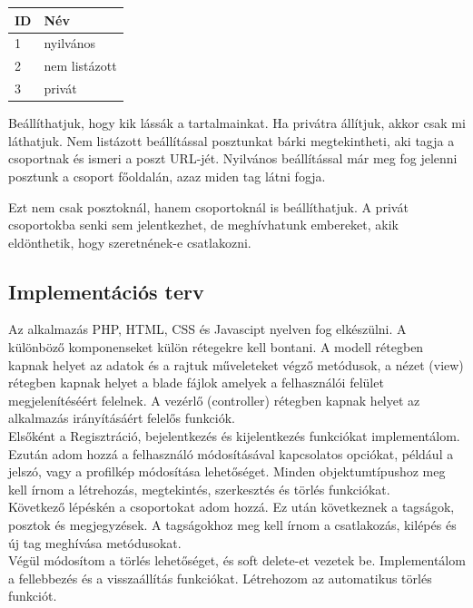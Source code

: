 \documentclass[
]{thesis-ekf}
\theoremstyle{definition}
\theoremstyle{remark}
\begin{document}
\begin{table}[H]
	\begin{tabular}{|l|l|}
		\hline
		\rule{0pt}{4ex}\rule[-2ex]{0pt}{0pt}
		\textbf{ID} &
		\textbf{Név} \\
		\hline
		1 &
		nyilvános \\
		\hline
		2 &
		nem listázott \\
		\hline
		3 &
		privát \\
		\hline
	\end{tabular}
\end{table}
\noindent
Beállíthatjuk, hogy kik lássák a tartalmainkat. Ha privátra állítjuk, akkor csak mi láthatjuk. Nem listázott beállítással posztunkat bárki megtekintheti, aki tagja a csoportnak és ismeri a poszt URL-jét. Nyilvános beállítással már meg fog jelenni posztunk a csoport főoldalán, azaz miden tag látni fogja.

Ezt nem csak posztoknál, hanem csoportoknál is beállíthatjuk. A privát csoportokba senki sem jelentkezhet, de meghívhatunk embereket, akik eldönthetik, hogy szeretnének-e csatlakozni.

\subsection{Implementációs terv}

Az alkalmazás PHP, HTML, CSS és Javascipt nyelven fog elkészülni. A különböző komponenseket külön rétegekre kell bontani. A modell rétegben kapnak helyet az adatok és a rajtuk műveleteket végző metódusok, a nézet (view) rétegben kapnak helyet a blade fájlok amelyek a felhasználói felület megjelenítéséért felelnek. A vezérlő (controller) rétegben kapnak helyet az alkalmazás irányításáért felelős funkciók.
\vspace{5mm}
\\
Elsőként a Regisztráció, bejelentkezés és kijelentkezés funkciókat implementálom. Ezután adom hozzá a felhasználó módosításával kapcsolatos opciókat, például a jelszó, vagy a profilkép módosítása lehetőséget.
Minden objektumtípushoz meg kell írnom a létrehozás, megtekintés, szerkesztés és törlés funkciókat.
\vspace{5mm}
\\
Következő lépéskén a csoportokat adom hozzá. Ez után következnek a tagságok, posztok és megjegyzések. A tagságokhoz meg kell írnom a csatlakozás, kilépés és új tag meghívása metódusokat.
\vspace{5mm}
\\
Végül módosítom a törlés lehetőséget, és soft delete-et vezetek be. Implementálom a fellebbezés és a visszaállítás funkciókat. Létrehozom az automatikus törlés funkciót.
\end{document}
